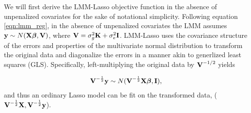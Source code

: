 We will first derive the LMM-Lasso objective function in the absence of unpenalized covariates for the sake of notational simplicity. Following equation \eqref{eqn:lmm_reg}, in the absence of unpenalized covariates the LMM assumes $\textbf{y} \sim N(\textbf{X} \boldsymbol{\beta}{}, \textbf{V})$, where $\textbf{V} = \sigma^2_g \textbf{K} + \sigma^2_e \textbf{I}$. LMM-Lasso uses the covariance structure of the errors and properties of the multivariate normal distribution to transform the original data and diagonalize the errors in a manner akin to generlized least squares (GLS). Specifically, left-multiplying the original data by $\textbf{V}^{-1/2}$ yields 

\begin{equation}
\label{eqn:rtY_distn}
\textbf{V}^{-\frac{1}{2}}\textbf{y} \sim N(\textbf{V}^{-\frac{1}{2}} \textbf{X} \boldsymbol{\beta}{}, \textbf{I}),
\end{equation}
and thus an ordinary Lasso model can be fit on the transformed data, ($\textbf{V}^{-\frac{1}{2}}\textbf{X}, \textbf{V}^{-\frac{1}{2}}\textbf{y}$). 

